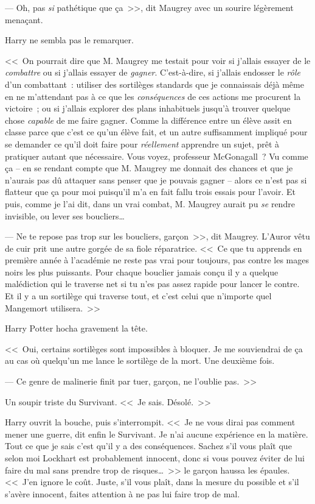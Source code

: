 --- Oh, pas \emph{si} pathétique que ça~>>, dit Maugrey avec un sourire légèrement menaçant.

Harry ne sembla pas le remarquer.

<<~On pourrait dire que M. Maugrey me testait pour voir si j'allais essayer de le \emph{combattre} ou si j'allais essayer de \emph{gagner}. C'est-à-dire, si j'allais endosser le \emph{rôle} d'un combattant~: utiliser des sortilèges standards que je connaissais déjà même en ne m'attendant pas à ce que les \emph{conséquences} de ces actions me procurent la victoire~; ou si j'allais explorer des plans inhabituels jusqu'à trouver quelque chose \emph{capable} de me faire gagner. Comme la différence entre un élève assit en classe parce que c'est ce qu'un élève fait, et un autre suffisamment impliqué pour se demander ce qu'il doit faire pour \emph{réellement} apprendre un sujet, prêt à pratiquer autant que nécessaire. Vous voyez, professeur McGonagall~? Vu comme ça -- en se rendant compte que M. Maugrey me donnait des chances et que je n'aurais pas dû attaquer sans penser que je pouvais gagner -- alors ce n'est pas si flatteur que ça pour moi puisqu'il m'a en fait fallu trois essais pour l'avoir. Et puis, comme je l'ai dit, dans un vrai combat, M. Maugrey aurait pu \emph{se} rendre invisible, ou lever ses boucliers…

--- Ne te repose pas trop sur les boucliers, garçon~>>, dit Maugrey. L'Auror vêtu de cuir prit une autre gorgée de sa fiole réparatrice. <<~Ce que tu apprends en première année à l'académie ne reste pas vrai pour toujours, pas contre les mages noirs les plus puissants. Pour chaque bouclier jamais conçu il y a quelque malédiction qui le traverse net si tu n'es pas assez rapide pour lancer le contre. Et il y a un sortilège qui traverse tout, et c'est celui que n'importe quel Mangemort utilisera.~>>

Harry Potter hocha gravement la tête.

<<~Oui, certains sortilèges sont impossibles à bloquer. Je me souviendrai de ça au cas où quelqu'un me lance le sortilège de la mort. Une deuxième fois.

--- Ce genre de malinerie finit par tuer, garçon, ne l'oublie pas.~>>

Un soupir triste du Survivant. <<~Je sais. Désolé.~>>

Harry ouvrit la bouche, puis s'interrompit. <<~Je ne vous dirai pas comment mener une guerre, dit enfin le Survivant. Je n'ai aucune expérience en la matière. Tout ce que je sais c'est qu'il y a des conséquences. Sachez s'il vous plaît que selon moi Lockhart est probablement innocent, donc si vous pouvez éviter de lui faire du mal sans prendre trop de risques…~>> le garçon haussa les épaules. <<~J'en ignore le coût. Juste, s'il vous plaît, dans la mesure du possible et s'il s'avère innocent, faites attention à ne pas lui faire trop de mal.

